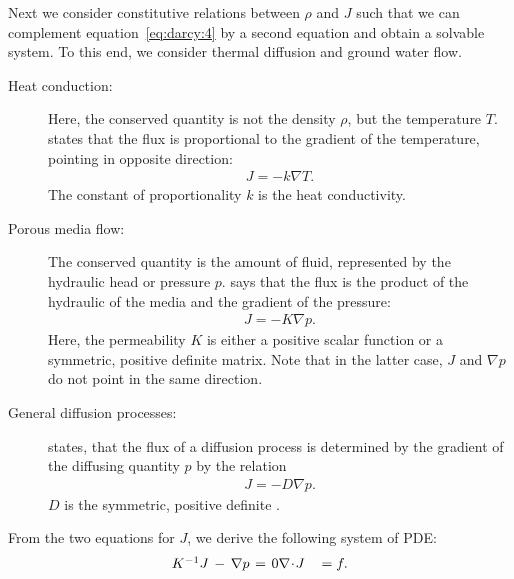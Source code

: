 \begin{example}
  Next we consider constitutive relations between $\rho$ and $J$ such
  that we can complement equation~\eqref{eq:darcy:4} by a second
  equation and obtain a solvable system. To this end, we consider
  thermal diffusion and ground water flow.

  \begin{description}
  \item[Heat conduction:] Here, the conserved quantity is not the
    density $\rho$, but the temperature $T$. 
    states that the flux is proportional to the gradient of the
    temperature, pointing in opposite direction:
    \begin{gather*}
      J = -k\nabla T.
    \end{gather*}
    The constant of proportionality $k$ is the heat conductivity.
  \item[Porous media flow:] The conserved quantity is the amount of
    fluid, represented by the hydraulic head or pressure
    $p$.  says that the flux is the product of the
    hydraulic  of the media and the gradient of the
    pressure:
    \begin{gather*}
      J = -K\nabla p.
    \end{gather*}
    Here, the permeability $K$ is either a positive scalar function or
    a symmetric, positive definite matrix. Note that in the latter
    case, $J$ and $\nabla p$ do not point in the same direction.
    \item[General diffusion processes:]  states,
      that the flux of a diffusion process is determined by the
      gradient of the diffusing quantity $p$ by the relation
    \begin{gather*}
      J = -D\nabla p.
    \end{gather*}
    $D$ is the symmetric, positive definite .
  \end{description}
\end{example}

\begin{intro}
  From the two equations for $J$, we derive the following system of
  PDE:
  \begin{gather*}
    \arraycolsep2pt
    \begin{matrix}
      K^{-1} J &-& \nabla p &=& 0
      \div J &&&= f.
    \end{matrix}
  \end{gather*}
\end{intro}




